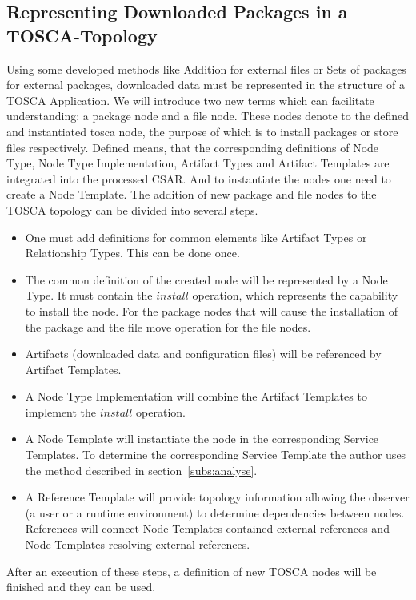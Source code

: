 \subsection{Representing Downloaded Packages in a TOSCA-Topology} \label{subs:repres}
Using some developed methods like Addition for external files or Sets of packages for external packages, downloaded data must be represented in the structure of a TOSCA Application.
We will introduce two new terms which can facilitate understanding: a package node and a file node.
These nodes denote to the defined and instantiated \gls{tosca} node, the purpose of which is to install packages or store files respectively.
Defined means, that the corresponding definitions of Node Type, Node Type Implementation, Artifact Types and Artifact Templates are integrated into the processed CSAR.
And to instantiate the nodes one need to create a Node Template.
The addition of new package and file nodes to the TOSCA topology can be divided into several steps.
\begin{itemize}
	\item One must add definitions for common elements like Artifact Types or Relationship Types. 
		This can be done once.
	\item The common definition of the created node will be represented by a Node Type.   
		It must contain the $install$ operation, which represents the capability to install the node.
		For the package nodes that will cause the installation of the package and the file move operation for the file nodes.
	\item Artifacts (downloaded data and configuration files) will be referenced by Artifact Templates.
	\item A Node Type Implementation will combine the Artifact Templates to implement the $install$ operation.
	\item A Node Template will instantiate the node in the corresponding Service Templates.
		To determine the corresponding Service Template the author  uses the method described in section~\ref{subs:analyse}.
	\item A Reference Template will provide topology information allowing the observer (a user or a runtime environment) to determine dependencies between nodes.
		References will connect Node Templates contained external references and Node Templates resolving external references.
\end{itemize}
After an execution of these steps, a definition of new TOSCA nodes will be finished and they can be used.

